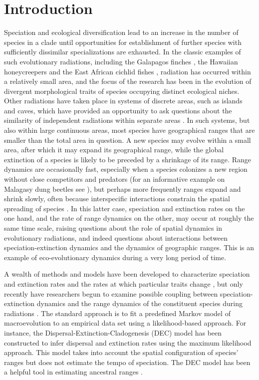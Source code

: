 \section*{Introduction}
\noindent Speciation and ecological diversification lead to an increase in the number of species in a clade until opportunities for establishment of further species with sufficiently dissimilar specializations are exhausted. 
In the classic examples of such evolutionary radiations, including the Galapagos finches \citep{Grant1999}, the Hawaiian honeycreepers \citep{Freed1987, Futuyama1998, Lovette2002} and the East African cichlid fishes \citep{Verheyen2003, Seehausen2006, Day2008}, radiation has occurred within a relatively small area, and the focus of the research has been in the evolution of divergent morphological traits of species occupying distinct ecological niches. 
Other radiations have taken place in systems of discrete areas, such as islands and caves, which have provided an opportunity to ask questions about the similarity of independent radiations within separate areas \citep{Mahler2013}. 
In such systems, but also within large continuous areas, most species have geographical ranges that are smaller than the total area in question. 
A new species may evolve within a small area, after which it may expand its geographical range, while the global extinction of a species is likely to be preceded by a shrinkage of its range. Range dynamics are occasionally fast, especially when a species colonizes a new region without close competitors and predators (for an informative example on Malagasy dung beetles see \citet{Hanski2008}), but perhaps more frequently ranges expand and shrink slowly, often because interspecific interactions constrain the spatial spreading of species \citep{Waters2013}. 
In this latter case, speciation and extinction rates on the one hand, and the rate of range dynamics on the other, may occur at roughly the same time scale, raising questions about the role of spatial dynamics in evolutionary radiations, and indeed questions about interactions between speciation-extinction dynamics and the dynamics of geographic ranges. 
This is an example of eco-evolutionary dynamics during a very long period of time. 

A wealth of methods and models have been developed to characterize speciation and extinction rates and the rates at which particular traits change \citep{FitzJohn2012}, but only recently have researchers begun to examine possible coupling between speciation-extinction dynamics and the range dynamics of the constituent species during radiations \citep{Goldberg2011, Stadler2013}. 
The standard approach is to fit a predefined Markov model of macroevolution to an empirical data set using a likelihood-based approach. 
For instance, the Dispersal-Extinction-Cladogenesis (DEC) \citep{Ree2008} model has been constructed to infer dispersal and extinction rates using the maximum likelihood approach.
This model takes into account the spatial configuration of species’ ranges but does not estimate the tempo of speciation. 
The DEC model has been a helpful tool in estimating ancestral ranges \citep{Clark2008, Ramirez2010, Buerki2012}. 

